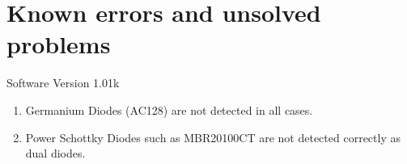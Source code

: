 
\chapter{Known errors and unsolved problems}
{\center Software Version 1.01k}

\begin{enumerate}

\item Germanium Diodes (AC128) are not detected in all cases.

\item Power Schottky Diodes such as MBR20100CT are not detected correctly as dual diodes.

\end{enumerate}
